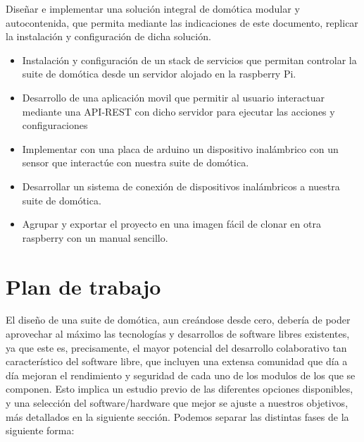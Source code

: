 Diseñar e implementar una solución integral de domótica modular y autocontenida, que permita mediante las indicaciones de este documento, replicar la instalación y configuración de dicha solución.
\begin{itemize}
  \item Instalación y configuración de un stack de servicios que permitan controlar la suite de domótica desde un servidor alojado en la raspberry Pi.

  \item Desarrollo de una aplicación movil que permitir al usuario interactuar mediante una API-REST con dicho servidor para ejecutar las acciones y configuraciones

  \item Implementar con una placa de arduino un dispositivo inalámbrico con un sensor que interactúe con nuestra suite de domótica.

  \item Desarrollar un sistema de conexión de dispositivos inalámbricos a nuestra suite de domótica.

  \item Agrupar y exportar el proyecto en una imagen fácil de clonar en otra raspberry con un manual sencillo.
\end{itemize}

\section{Plan de trabajo}
\label{ch:Capitulo1.3}

El diseño de una suite de domótica, aun creándose desde cero, debería de poder aprovechar al máximo las tecnologías y desarrollos de software libres existentes, ya que este es, precisamente, el mayor potencial del desarrollo colaborativo tan característico del software libre, que incluyen una extensa comunidad que día a día mejoran el rendimiento y seguridad de cada uno de los modulos de los que se componen. Esto implica un estudio previo de las diferentes opciones disponibles, y una selección del software/hardware que mejor se ajuste a nuestros objetivos, más detallados en la siguiente sección. Podemos separar las distintas fases de la siguiente forma:

